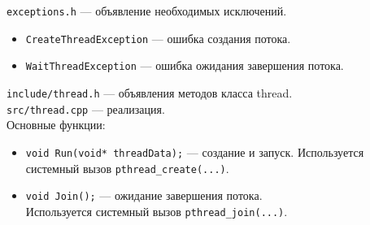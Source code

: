 \texttt{exceptions.h} --- объявление необходимых исключений.
\begin{itemize}
\item \texttt{CreateThreadException} --- ошибка создания потока.
\item \texttt{WaitThreadException} --- ошибка ожидания завершения потока.
\end{itemize}

\texttt{include/thread.h} --- объявления методов класса thread. \\ 
\texttt{src/thread.cpp} --- реализация.\\

Основные функции:
\begin{itemize}
\item \texttt{void Run(void* threadData);} --- создание и запуск. Используется системный вызов \texttt{pthread\_create(...)}.
\item \texttt{void Join();} --- ожидание завершения потока. \\
Используется системный вызов \texttt{pthread\_join(...)}.
\end{itemize}

